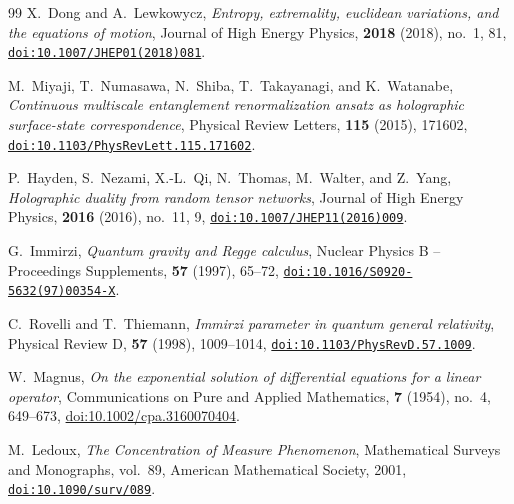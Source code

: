 \documentclass[11pt,a4paper,reqno]{amsart}
\theoremstyle{definition}
\numberwithin{equation}{section}
\providecommand{\doi}[1]{\href{https://doi.org/#1}{\nolinkurl{doi:#1}}}
\begin{document}
\begin{thebibliography}{99}
X.~Dong and A.~Lewkowycz,
\emph{Entropy, extremality, euclidean variations, and the equations of motion},
Journal of High Energy Physics, \textbf{2018} (2018), no.~1, 81,
\doi{10.1007/JHEP01(2018)081}.

M.~Miyaji, T.~Numasawa, N.~Shiba, T.~Takayanagi, and K.~Watanabe,
\emph{Continuous multiscale entanglement renormalization ansatz as holographic surface-state correspondence},
Physical Review Letters, \textbf{115} (2015), 171602,
\doi{10.1103/PhysRevLett.115.171602}.

P.~Hayden, S.~Nezami, X.-L.~Qi, N.~Thomas, M.~Walter, and Z.~Yang,
\emph{Holographic duality from random tensor networks},
Journal of High Energy Physics, \textbf{2016} (2016), no.~11, 9,
\doi{10.1007/JHEP11(2016)009}.

G.~Immirzi,
\emph{Quantum gravity and Regge calculus},
Nuclear Physics B -- Proceedings Supplements, \textbf{57} (1997), 65--72,
\doi{10.1016/S0920-5632(97)00354-X}.

C.~Rovelli and T.~Thiemann,
\emph{Immirzi parameter in quantum general relativity},
Physical Review D, \textbf{57} (1998), 1009--1014,
\doi{10.1103/PhysRevD.57.1009}.

W.~Magnus,
\emph{On the exponential solution of differential equations for a linear operator},
Communications on Pure and Applied Mathematics, \textbf{7} (1954), no.~4, 649--673,
\href{https://doi.org/10.1002/cpa.3160070404}{doi:10.1002/cpa.3160070404}.

M.~Ledoux,
\emph{The Concentration of Measure Phenomenon},
Mathematical Surveys and Monographs, vol.~89, American Mathematical Society, 2001,
\doi{10.1090/surv/089}.

\end{thebibliography}
\end{document}
